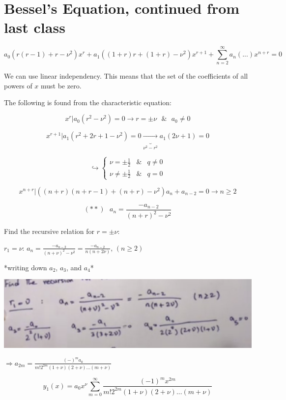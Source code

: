 \graphicspath{{./Lecture5/}}

\section{Bessel's Equation, continued from last class}

$$a_0 (r(r-1) + r - \nu^2) x^r + a_1 \left((1+r)r + (1+r) - \nu^2 \right) x^{r+1} + \sum_{n = 2}^\infty a_n \left(... \right) x^{n+r} = 0$$

We can use linear independency. This means that the set of the coefficients of all powers of $x$ must be zero.

The following is found from the characteristic equation:

$$x^r | a_0 (r^2 - \nu^2) = 0 \longrightarrow r = \pm \nu \text{ }\& \text{ } a_0 \neq 0$$

$$x^{r+1} | a_1 \left(r^2 + 2r + 1 - \nu^2 \right) = 0 \underbrace{\longrightarrow}_{\nu^2 - r^2} a_1 (2 \nu + 1) = 0$$

$$\hookrightarrow \left\{ \begin{matrix} \nu = \pm \frac{1}{2} &  \& & q \neq 0 \\ \nu \neq \pm \frac{1}{2} & \& & q = 0 \end{matrix} \right.$$

$$x^{n+r} | \left((n+r) (n+r-1) + (n+r) - \nu^2 \right) a_n + a_{n-2} = 0 \longrightarrow n \geq 2$$

$$(**)\text{ } a_n = \frac{-a_{n-2}}{(n+r)^2 - \nu^2}$$

Find the recursive relation for $r = \pm \nu$:

$r_1 = \nu$: $a_n = \frac{-a_{n-2}}{(n+\nu)^2 - \nu^2} = \frac{-a_{n-2}}{n(n + 2 \nu)}$,  $(n \geq 2)$

*writing down $a_2$, $a_3$, and $a_4$*

\includegraphics[width = 0.8 \textwidth]{image2.png}

\hfill

$\Rightarrow a_{2m} = \frac{(-)^m a_0}{m! 2^{2m} (1 + \nu) (2 + \nu) ... (m + \nu)}$

$$y_1(x) = a_0 x^{\nu} \sum_{m = 0}^\infty \frac{(-1)^m x^{2m}}{m! 2^{2m} (1 + \nu)(2 + \nu) ... (m + \nu)}$$

